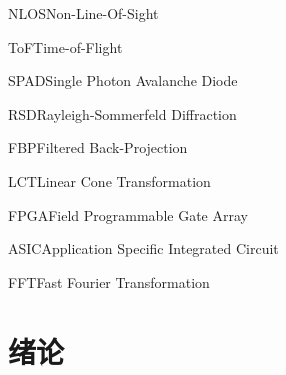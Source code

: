 \documentclass[master]{shtthesis}             %
\makeatletter
\def\ifgraduate{\ifsht@graduate}
\makeatother
\begin{document}
\ifgraduate

\begin{nomenclatures}[缩写]
  \item{NLOS}{Non-Line-Of-Sight}
  \item{ToF}{Time-of-Flight}
  \item{SPAD}{Single Photon Avalanche Diode}
  \item{RSD}{Rayleigh-Sommerfeld Diffraction}
  \item{FBP}{Filtered Back-Projection}
  \item{LCT}{Linear Cone Transformation}
  \item{FPGA}{Field Programmable Gate Array}
  \item{ASIC}{Application Specific Integrated Circuit}
  \item{FFT}{Fast Fourier Transformation}
\end{nomenclatures}

\fi

\mainmatter
\chapter{绪论}
\end{document}
